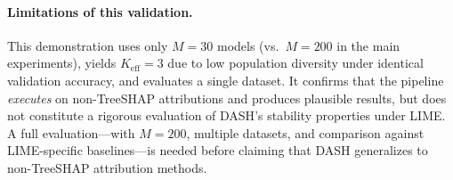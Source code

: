 \documentclass[11pt]{article}
\newcommand{\dash}{\textsc{DASH}}
\begin{document}
\paragraph{Limitations of this validation.}
This demonstration uses only $M = 30$ models (vs.\ $M = 200$ in the
main experiments), yields $K_{\text{eff}} = 3$ due to low population
diversity under identical validation accuracy, and evaluates a single
dataset.  It confirms that the pipeline \emph{executes} on
non-TreeSHAP attributions and produces plausible results, but does not
constitute a rigorous evaluation of \dash{}'s stability properties
under LIME.  A full evaluation---with $M = 200$, multiple datasets,
and comparison against LIME-specific baselines---is needed before
claiming that \dash{} generalizes to non-TreeSHAP attribution methods.
\end{document}
